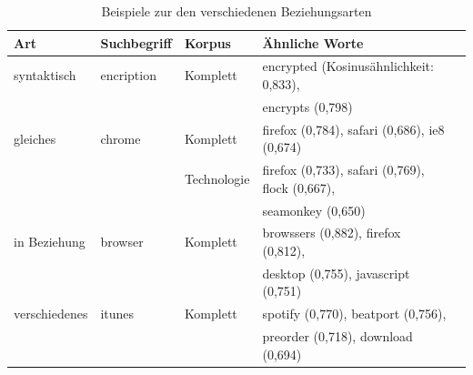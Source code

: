 \documentclass[12pt,a4paper]{report}
\begin{document}
\begin{table}[h]
\caption{Beispiele zur den verschiedenen Beziehungsarten}
\begin{center}
\begin{tabular}{|l||l|l|l|l|}
\hline
Art & Suchbegriff & Korpus & Ähnliche Worte   \\
\hline
\hline
 syntaktisch&encription & Komplett & encrypted (Kosinusähnlichkeit: 0,833),\\
& 	&	& encrypts (0,798)\\
 \hline
 gleiches &chrome	   & Komplett & firefox (0,784), safari (0,686), ie8 (0,674) \\
   &	   & Technologie & firefox (0,733), safari (0,769), flock (0,667),\\
   &&& seamonkey (0,650) \\
\hline
 in Beziehung& browser	 & Komplett & browssers (0,882), firefox (0,812),\\
 &&& desktop (0,755), javascript (0,751)\\
 \hline
verschiedenes& itunes	& Komplett& spotify (0,770), beatport (0,756),\\
&&& preorder (0,718), download (0,694)\\
 	\hline
 
\end{tabular}
\end{center}
\end{table}
\end{document}
